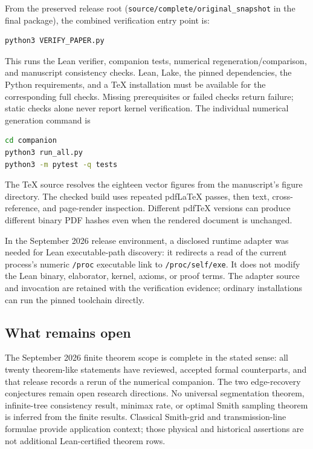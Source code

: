 \documentclass[11pt,letterpaper]{article}
\theoremstyle{plain}
\theoremstyle{plain}
\theoremstyle{plain}
\theoremstyle{definition}
\theoremstyle{definition}
\theoremstyle{definition}
\theoremstyle{definition}
\theoremstyle{remark}
\theoremstyle{remark}
\theoremstyle{remark}
\theoremstyle{remark}
\begin{document}
From the preserved release root (\texttt{source/complete/original\_snapshot} in the final package), the combined verification entry point is:
\begin{lstlisting}[language=bash,numbers=none]
python3 VERIFY_PAPER.py
\end{lstlisting}
This runs the Lean verifier, companion tests, numerical regeneration/comparison, and manuscript consistency checks. Lean, Lake, the pinned dependencies, the Python requirements, and a TeX installation must be available for the corresponding full checks. Missing prerequisites or failed checks return failure; static checks alone never report kernel verification. The individual numerical generation command is
\begin{lstlisting}[language=bash,numbers=none]
cd companion
python3 run_all.py
python3 -m pytest -q tests
\end{lstlisting}
The TeX source resolves the eighteen vector figures from the manuscript's figure directory. The checked build uses repeated pdfLaTeX passes, then text, cross-reference, and page-render inspection. Different pdfTeX versions can produce different binary PDF hashes even when the rendered document is unchanged.

In the September 2026 release environment, a disclosed runtime adapter was needed for Lean executable-path discovery: it redirects a read of the current process's numeric \texttt{/proc} executable link to \texttt{/proc/self/exe}. It does not modify the Lean binary, elaborator, kernel, axioms, or proof terms. The adapter source and invocation are retained with the verification evidence; ordinary installations can run the pinned toolchain directly.

\subsection{What remains open}

The September 2026 finite theorem scope is complete in the stated sense: all twenty theorem-like statements have reviewed, accepted formal counterparts, and that release records a rerun of the numerical companion. The two edge-recovery conjectures remain open research directions. No universal segmentation theorem, infinite-tree consistency result, minimax rate, or optimal Smith sampling theorem is inferred from the finite results. Classical Smith-grid and transmission-line formulae provide application context; those physical and historical assertions are not additional Lean-certified theorem rows.
\end{document}
